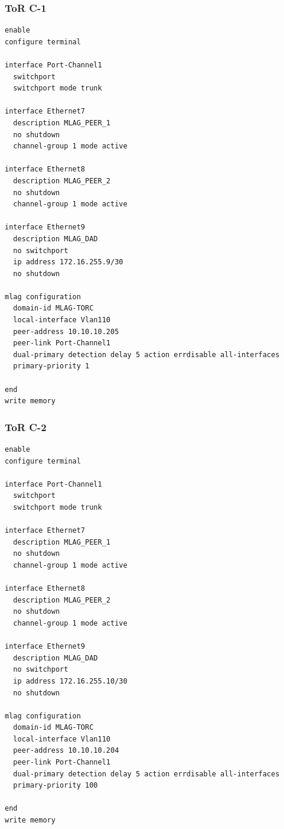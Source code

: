 \subsubsection{ToR C-1}
\begin{lstlisting}[caption={ToR C-1: MLAG peer-link and domain configuration.},basicstyle=\ttfamily\footnotesize,breaklines=true]
enable
configure terminal

interface Port-Channel1
  switchport
  switchport mode trunk

interface Ethernet7
  description MLAG_PEER_1
  no shutdown
  channel-group 1 mode active

interface Ethernet8
  description MLAG_PEER_2
  no shutdown
  channel-group 1 mode active

interface Ethernet9
  description MLAG_DAD
  no switchport
  ip address 172.16.255.9/30
  no shutdown

mlag configuration
  domain-id MLAG-TORC
  local-interface Vlan110
  peer-address 10.10.10.205
  peer-link Port-Channel1
  dual-primary detection delay 5 action errdisable all-interfaces
  primary-priority 1

end
write memory
\end{lstlisting}

\subsubsection{ToR C-2}
\begin{lstlisting}[caption={ToR C-2: MLAG peer-link and domain configuration.},basicstyle=\ttfamily\footnotesize,breaklines=true]
enable
configure terminal

interface Port-Channel1
  switchport
  switchport mode trunk

interface Ethernet7
  description MLAG_PEER_1
  no shutdown
  channel-group 1 mode active

interface Ethernet8
  description MLAG_PEER_2
  no shutdown
  channel-group 1 mode active

interface Ethernet9
  description MLAG_DAD
  no switchport
  ip address 172.16.255.10/30
  no shutdown

mlag configuration
  domain-id MLAG-TORC
  local-interface Vlan110
  peer-address 10.10.10.204
  peer-link Port-Channel1
  dual-primary detection delay 5 action errdisable all-interfaces
  primary-priority 100

end
write memory
\end{lstlisting}

